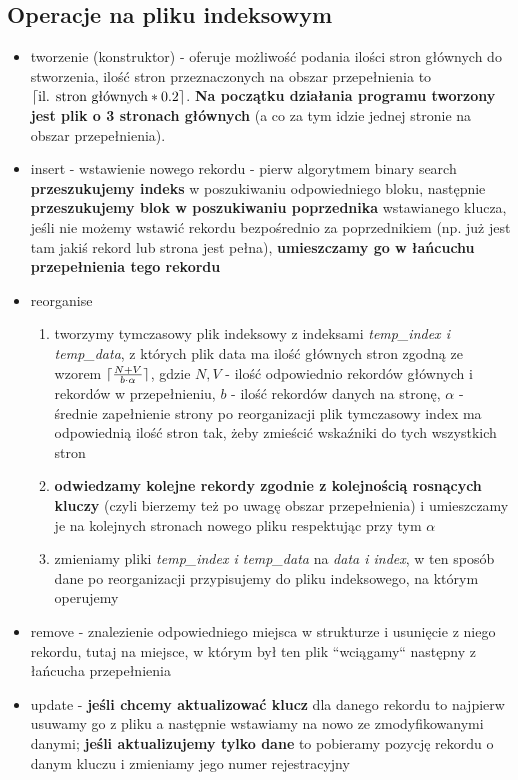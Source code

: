 \documentclass{article}
\DeclarePairedDelimiter\ceil{\lceil}{\rceil}
\begin{document}
\subsection{Operacje na pliku indeksowym}
\begin{itemize}
\item tworzenie (konstruktor) - oferuje możliwość podania ilości stron głównych do stworzenia, ilość
	stron przeznaczonych na obszar przepełnienia to $\ceil{\text{il.  stron głównych} * 0.2}$. \textbf{Na początku działania programu tworzony jest plik o 3 stronach głównych} (a co za tym idzie jednej stronie na obszar przepełnienia).
\item insert - wstawienie nowego rekordu - pierw algorytmem binary search \textbf{przeszukujemy indeks} w poszukiwaniu odpowiedniego bloku,  następnie \textbf{przeszukujemy blok w poszukiwaniu poprzednika} wstawianego klucza, jeśli nie możemy wstawić rekordu bezpośrednio za poprzednikiem (np. już jest tam jakiś rekord lub strona jest pełna),  \textbf{umieszczamy go w łańcuchu przepełnienia tego rekordu} 
\item reorganise 
\begin{enumerate}
	\item tworzymy tymczasowy plik indeksowy z indeksami \textit{temp\_index i temp\_data}, z których plik data ma ilość głównych stron zgodną ze wzorem $\ceil{\frac{N+V}{b\cdot\alpha}}$,  gdzie $N,V$ - ilość odpowiednio  rekordów głównych i rekordów w przepełnieniu, $b$ - ilość rekordów danych na stronę, $\alpha$ - średnie zapełnienie strony po reorganizacji
 plik tymczasowy index ma odpowiednią ilość stron tak, żeby zmieścić wskaźniki do tych wszystkich stron
	\item \textbf{odwiedzamy kolejne rekordy zgodnie z kolejnością rosnących kluczy} (czyli bierzemy też po uwagę obszar przepełnienia) i umieszczamy je na kolejnych stronach nowego pliku respektując przy tym $\alpha$
	\item zmieniamy pliki \textit{temp\_index i temp\_data} na \textit{data i index},  w ten sposób dane po reorganizacji przypisujemy do pliku indeksowego, na którym operujemy
\end{enumerate}
\item remove - znalezienie odpowiedniego miejsca w strukturze i usunięcie z niego rekordu, tutaj na miejsce, w którym był ten plik ``wciągamy`` następny z łańcucha przepełnienia
\item update - \textbf{jeśli chcemy aktualizować klucz} dla danego rekordu to najpierw usuwamy go z pliku a następnie wstawiamy na nowo ze zmodyfikowanymi danymi; \textbf{jeśli aktualizujemy tylko dane} to pobieramy pozycję rekordu o danym kluczu i zmieniamy jego numer rejestracyjny
\end{itemize}
\end{document}
